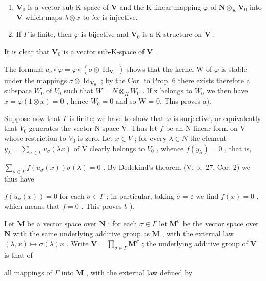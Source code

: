 \begin{enumerate}
\def\labelenumi{\alph{enumi})}
\item
  \(\mathbf{V}_0\) is a vector sub-K-space of \(\mathbf{V}\) and the K-linear mapping \(\varphi\) of \(\mathbf{N} \otimes_{\mathbf{K}} \mathbf{V}_0\) into \(\mathbf{V}\) which maps \(\lambda \otimes x\) to \(\lambda x\) is injective.
\item
  If \(\Gamma\) is finite, then \(\varphi\) is bijective and \(\mathbf{V}_0\) is a K-structure on \(\mathbf{V}\) .
\end{enumerate}

It is clear that \(\mathbf{V}_0\) is a vector sub-K-space of \(\mathbf{V}\) .

The formula \(u_{\sigma} \circ \varphi = \varphi \circ (\sigma \otimes \operatorname{Id}_{\mathbf{V}_{0}})\) shows that the kernel W of \(\varphi\) is stable under the mappings \(\sigma \otimes \operatorname{Id}_{\mathbf{V}_{0}}\) ; by the Cor. to Prop. 6 there exists therefore a subspace \(W_{0}\) of \(V_{0}\) such that \(W = N \otimes_{K} W_{0}\) . If x belongs to \(W_{0}\) we then have \(x = \varphi(1 \otimes x) = 0\) , hence \(W_{0} = 0\) and so W = 0. This proves a).

Suppose now that \(\Gamma\) is finite; we have to show that \(\varphi\) is surjective, or equivalently that \(V_0\) generates the vector N-space V. Thus let \(f\) be an N-linear form on V whose restriction to \(V_0\) is zero. Let \(x \in V\) ; for every \(\lambda \in N\) the element \(y_\lambda = \sum_{\sigma \in \Gamma} u_\sigma(\lambda x)\) of V clearly belongs to \(V_0\) , whence \(f(y_\lambda) = 0\) , that is,

\(\sum_{\sigma \in \Gamma}f(u_{\sigma}(x))\sigma (\lambda) = 0\) . By Dedekind's theorem (V, p.~27, Cor. 2) we thus have

\(f(u_{\sigma}(x)) = 0\) for each \(\sigma \in \Gamma\) ; in particular, taking \(\sigma = \varepsilon\) we find \(f(x) = 0\) , which means that \(f = 0\) . This proves \(b\) ).

Let \(\mathbf{M}\) be a vector space over \(\mathbf{N}\) ; for each \(\sigma \in \Gamma\) let \(\mathbf{M}^{\sigma}\) be the vector space over \(\mathbf{N}\) with the same underlying additive group as \(\mathbf{M}\) , with the external law \((\lambda, x) \mapsto \sigma(\lambda)x\) . Write \(\mathbf{V} = \prod_{\sigma \in \Gamma} \mathbf{M}^{\sigma}\) ; the underlying additive group of \(\mathbf{V}\) is that of

all mappings of \(\Gamma\) into \(\mathbf{M}\) , with the external law defined by

